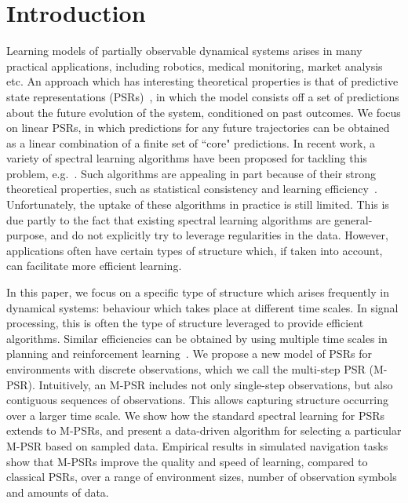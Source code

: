 \section{Introduction}

Learning models of partially observable dynamical systems arises in many practical applications, including robotics, medical monitoring, market analysis etc.  An approach which has interesting theoretical properties is that of predictive state representations (PSRs)~\cite{littmanpsr,singh04,rosencrantz04}, in which the model consists off a set of predictions about the future evolution of the system, conditioned on past outcomes.  We focus on linear PSRs, in which predictions for any future trajectories can be obtained as a linear combination of a finite set of ``core" predictions. In recent work, a variety of spectral learning algorithms have been proposed for tackling this problem, e.g.~\cite{bootspsr,Hamilton2013}. Such algorithms are appealing in part because of their strong theoretical properties, such as statistical consistency and learning efficiency~\cite{hsu09,bailly10}.  Unfortunately, the uptake of these algorithms in practice is still limited.  This is due partly to the fact that existing spectral learning algorithms are general-purpose, and do not explicitly try to leverage regularities in the data.  However, applications often have certain types of structure which, if taken into account, can facilitate more efficient learning.  

In this paper, we focus on a specific type of structure which arises frequently in dynamical systems: behaviour which takes place at different time scales.  In signal processing, this is often the type of structure leveraged to provide efficient algorithms.  Similar efficiencies can be obtained by using multiple time scales in planning and reinforcement learning~\cite{sutton99}.
We propose a new model of PSRs for environments with discrete observations, which we call the multi-step PSR (M-PSR).  Intuitively, an M-PSR includes not only single-step observations, but also contiguous sequences of observations.  This allows capturing structure occurring over a larger time scale. 
We show how the standard spectral learning for PSRs extends to M-PSRs, and
 present a data-driven algorithm for selecting a particular M-PSR based on sampled data.
 Empirical results in simulated navigation tasks show that M-PSRs improve the quality and speed of learning, compared to classical PSRs, over a range of environment sizes, number of observation symbols and amounts of data.
 
